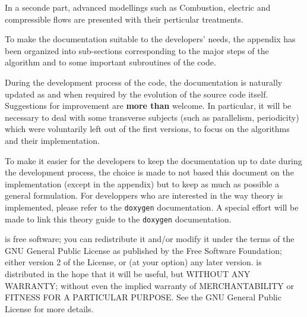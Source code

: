In a seconde part, advanced modellings such as Combustion, electric and compressible flows
 are presented with their perticular treatments.

To make the documentation suitable to the developers' needs, the appendix
has been organized into sub-sections corresponding to the major steps of the
algorithm and to some important subroutines of the code.

During the development process of the code, the documentation is naturally
updated as and when required by the evolution of the source code itself.
Suggestions for improvement are \textbf{more than} welcome. In particular, 
it will be necessary to deal with some transverse subjects 
(such as parallelism, periodicity) which were voluntarily left out of 
the first versions, to focus on the algorithms and their implementation.

To make it easier for the developers to keep the documentation up to date
during the development process, the choice is made to not based this document
on the implementation (except in the appendix) but to keep as much as possible 
a general formulation. For developpers who are interested in the way theory is
implemented, please refer to the \texttt{doxygen} documentation. 
A special effort will be made to link this theory guide to the \texttt{doxygen}
documentation.

\CS is free software; you can redistribute it
and/or modify it under the terms of the GNU General Public License
as published by the Free Software Foundation; either version 2 of
the License, or (at your option) any later version.
\CS is distributed in the hope that it will be
useful, but WITHOUT ANY WARRANTY; without even the implied warranty
of MERCHANTABILITY or FITNESS FOR A PARTICULAR PURPOSE.  See the
GNU General Public License for more details.

%

%
%
%
%

